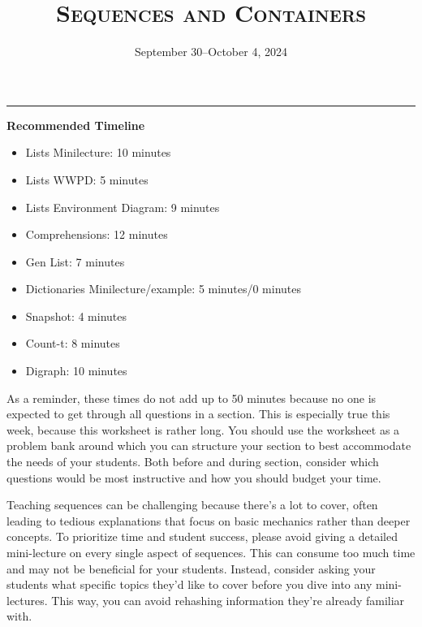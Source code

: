 \documentclass{exam}
\title{\textsc{Sequences and Containers}}
\date{September 30--October 4, 2024}
\begin{document}
\maketitle
\rule{\textwidth}{0.15em}


\begin{meta}
    \textbf{Recommended Timeline}
    \begin{itemize}
        \item Lists Minilecture: 10 minutes
        \item Lists WWPD: 5 minutes
        \item Lists Environment Diagram: 9 minutes
        \item Comprehensions: 12 minutes
        \item Gen List: 7 minutes
        \item Dictionaries Minilecture/example: 5 minutes/0 minutes
        \item Snapshot: 4 minutes
        \item Count-t: 8 minutes
        \item Digraph: 10 minutes
    \end{itemize}

    As a reminder, these times do not add up to 50 minutes because no one is expected 
    to get through all questions in a section. This is especially true this week, 
    because this worksheet is rather long. You should use the worksheet as a problem bank
     around which you can structure your section to best accommodate the needs of your 
     students. Both before and during section, consider which questions would be most 
     instructive and how you should budget your time.

	Teaching sequences can be challenging because there’s a lot to cover, often leading to tedious 	explanations that focus on basic mechanics rather than deeper concepts. To prioritize time and 	student success, please avoid giving a detailed mini-lecture on every single aspect of sequences. 	This can consume too much time and may not be beneficial for your students. Instead, consider 	asking your students what specific topics they’d like to cover before you dive into any mini-lectures. 	This way, you can avoid rehashing information they’re already familiar with.
\end{meta}
\end{document}
